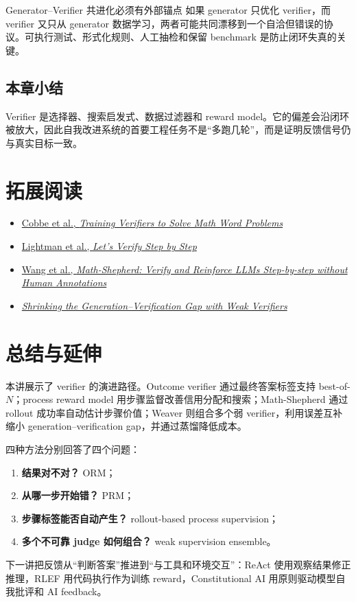 \documentclass[a4paper]{article}
\begin{document}
\begin{importantbox}{Generator--Verifier 共进化必须有外部锚点}
如果 generator 只优化 verifier，而 verifier 又只从 generator 数据学习，两者可能共同漂移到一个自洽但错误的协议。可执行测试、形式化规则、人工抽检和保留 benchmark 是防止闭环失真的关键。
\end{importantbox}

\subsection{本章小结}

Verifier 是选择器、搜索启发式、数据过滤器和 reward model。它的偏差会沿闭环被放大，因此自我改进系统的首要工程任务不是“多跑几轮”，而是证明反馈信号仍与真实目标一致。

\section{拓展阅读}

\begin{itemize}
    \item \href{https://arxiv.org/abs/2110.14168}{Cobbe et al., \emph{Training Verifiers to Solve Math Word Problems}}
    \item \href{https://arxiv.org/abs/2305.20050}{Lightman et al., \emph{Let's Verify Step by Step}}
    \item \href{https://arxiv.org/abs/2312.08935}{Wang et al., \emph{Math-Shepherd: Verify and Reinforce LLMs Step-by-step without Human Annotations}}
    \item \href{https://arxiv.org/abs/2506.18203}{\emph{Shrinking the Generation--Verification Gap with Weak Verifiers}}
\end{itemize}

\section{总结与延伸}

本讲展示了 verifier 的演进路径。Outcome verifier 通过最终答案标签支持 best-of-$N$；process reward model 用步骤监督改善信用分配和搜索；Math-Shepherd 通过 rollout 成功率自动估计步骤价值；Weaver 则组合多个弱 verifier，利用误差互补缩小 generation--verification gap，并通过蒸馏降低成本。

四种方法分别回答了四个问题：

\begin{enumerate}
    \item \textbf{结果对不对？} ORM；
    \item \textbf{从哪一步开始错？} PRM；
    \item \textbf{步骤标签能否自动产生？} rollout-based process supervision；
    \item \textbf{多个不可靠 judge 如何组合？} weak supervision ensemble。
\end{enumerate}

下一讲把反馈从“判断答案”推进到“与工具和环境交互”：ReAct 使用观察结果修正推理，RLEF 用代码执行作为训练 reward，Constitutional AI 用原则驱动模型自我批评和 AI feedback。
\end{document}
